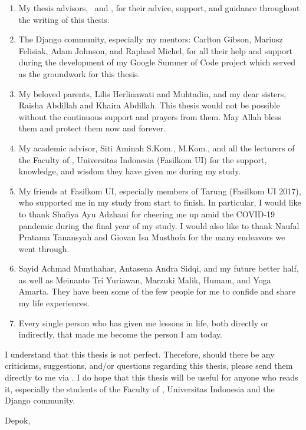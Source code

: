 \begin{enumerate}
    \item My thesis advisors, \pembimbingSatu\ and \pembimbingDua, for their
          advice, support, and guidance throughout the writing of this thesis.
    \item The Django community, especially my mentors: Carlton Gibson, Mariusz
          Felisiak, Adam Johnson, and Raphael Michel, for all their help and
          support during the development of my Google Summer of Code project
          which served as the groundwork for this thesis.
    \item My beloved parents, Lilis Herlinawati and Muhtadin, and my dear
          sisters, Raisha Abdillah and Khaira Abdillah. This thesis would not
          be possible without the continuous support and prayers from them. May
          Allah bless them and protect them now and forever.
    \item My academic advisor, Siti Aminah S.Kom., M.Kom., and all the
          lecturers of the Faculty of \fakultas, Universitas Indonesia
          (Fasilkom UI) for the support, knowledge, and wisdom they have given
          me during my study.
    \item My friends at Fasilkom UI, especially members of Tarung (Fasilkom UI
          2017), who supported me in my study from start to finish. In
          particular, I would like to thank Shafiya Ayu Adzhani for cheering me
          up amid the COVID-19 pandemic during the final year of my study. I
          would also like to thank Naufal Pratama Tanansyah and Giovan Isa
          Musthofa for the many endeavors we went through.
    \item Sayid Achmad Munthahar, Antasena Andra Sidqi, and my future better
          half, as well as Meinanto Tri Yuriawan, Marzuki Malik, Humam, and
          Yoga Amarta. They have been some of the few people for me to confide
          and share my life experiences.
    \item Every single person who has given me lessons in life, both directly
          or indirectly, that made me become the person I am today.
\end{enumerate}

I understand that this thesis is not perfect. Therefore, should there be any
criticisms, suggestions, and/or questions regarding this thesis, please send
them directly to me via
. I do hope
that this thesis will be useful for anyone who reads it, especially the
students of the Faculty of \fakultas, Universitas Indonesia and the Django
community.

\vspace*{0.1cm}
\begin{flushright}
Depok, \tanggalSiapSidang\\[0.1cm]
\vspace*{1.75cm}
\penulis

\end{flushright}
